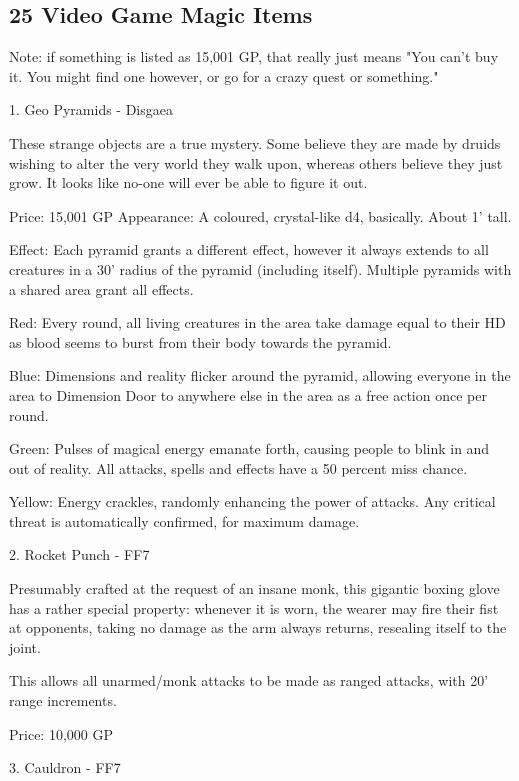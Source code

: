\subsection{25 Video Game Magic Items} \label{comm:25videogame}

Note: if something is listed as 15,001 GP, that really just means "You can't buy it. You might find one however, or go for a crazy quest or something."

\begin{multicols}{2}

1. Geo Pyramids - Disgaea

These strange objects are a true mystery. Some believe they are made by druids wishing to alter the very world they walk upon, whereas others believe they just grow. It looks like no-one will ever be able to figure it out.

Price: 15,001 GP
Appearance: A coloured, crystal-like d4, basically. About 1' tall.

Effect: Each pyramid grants a different effect, however it always extends to all creatures in a 30' radius of the pyramid (including itself). Multiple pyramids with a shared area grant all effects.

Red: Every round, all living creatures in the area take damage equal to their HD as blood seems to burst from their body towards the pyramid.

Blue: Dimensions and reality flicker around the pyramid, allowing everyone in the area to Dimension Door to anywhere else in the area as a free action once per round.

Green: Pulses of magical energy emanate forth, causing people to blink in and out of reality. All attacks, spells and effects have a 50 percent miss chance.

Yellow: Energy crackles, randomly enhancing the power of attacks. Any critical threat is automatically confirmed, for maximum damage.


2. Rocket Punch - FF7

Presumably crafted at the request of an insane monk, this gigantic boxing glove has a rather special property: whenever it is worn, the wearer may fire their fist at opponents, taking no damage as the arm always returns, resealing itself to the joint.

This allows all unarmed/monk attacks to be made as ranged attacks, with 20' range increments.

Price: 10,000 GP


3. Cauldron - FF7


\end{multicols}
